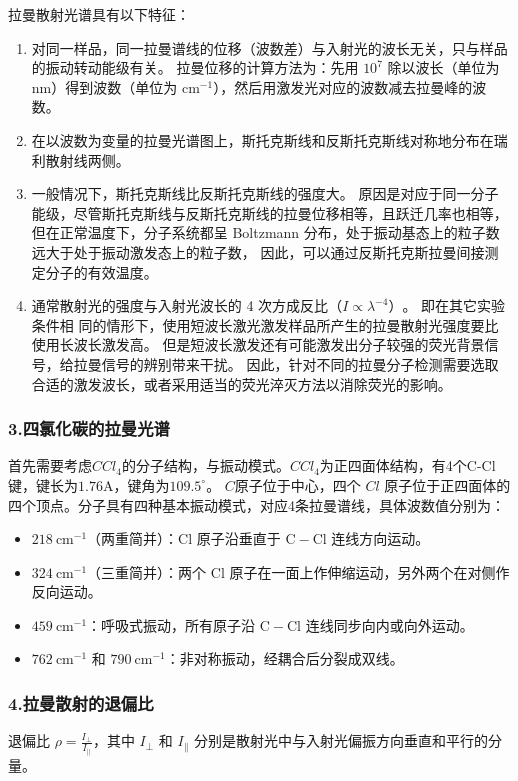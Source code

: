 \documentclass[12pt,a4paper,UTF8]{ctexart}
\begin{document}
	拉曼散射光谱具有以下特征：\cite{wiki_raman}
	\begin{enumerate}
		\item 对同一样品，同一拉曼谱线的位移（波数差）与入射光的波长无关，只与样品的振动转动能级有关。
		拉曼位移的计算方法为：先用 $10^7$ 除以波长（单位为 $\mathrm{nm}$）得到波数（单位为 $\mathrm{cm}^{-1}$），然后用激发光对应的波数减去拉曼峰的波数。
		\item 在以波数为变量的拉曼光谱图上，斯托克斯线和反斯托克斯线对称地分布在瑞利散射线两侧。
		\item 一般情况下，斯托克斯线比反斯托克斯线的强度大。
		原因是对应于同一分子能级，尽管斯托克斯线与反斯托克斯线的拉曼位移相等，且跃迁几率也相等，
		但在正常温度下，分子系统都呈 Boltzmann 分布，处于振动基态上的粒子数远大于处于振动激发态上的粒子数，
		因此，可以通过反斯托克斯拉曼间接测定分子的有效温度。
		\item 通常散射光的强度与入射光波长的 4 次方成反比$（I \propto \lambda^{-4}）$。 即在其它实验条件相
		同的情形下，使用短波长激光激发样品所产生的拉曼散射光强度要比使用长波长激发高。
		但是短波长激发还有可能激发出分子较强的荧光背景信号，给拉曼信号的辨别带来干扰。
		因此，针对不同的拉曼分子检测需要选取合适的激发波长，或者采用适当的荧光淬灭方法以消除荧光的影响。

	\end{enumerate}

\subsubsection*{3.四氯化碳的拉曼光谱}
	首先需要考虑$CCl_{4}$的分子结构，与振动模式。$CCl_{4}$为正四面体结构，有4个C-Cl键，键长为$1.76 \mathrm{A}$，键角为$109.5^{\circ}$。
	$ C $原子位于中心，四个 $ Cl $ 原子位于正四面体的四个顶点。分子具有四种基本振动模式，对应4条拉曼谱线，具体波数值分别为：
	\begin{itemize}
		\item $218 \mathrm{~cm}^{-1}$（两重简并）：$\mathrm{Cl}$ 原子沿垂直于 $\mathrm{C-Cl}$ 连线方向运动。
		\item $324 \mathrm{~cm}^{-1}$（三重简并）：两个 $\mathrm{Cl}$ 原子在一面上作伸缩运动，另外两个在对侧作反向运动。
		\item $459 \mathrm{~cm}^{-1}$：呼吸式振动，所有原子沿 $\mathrm{C-Cl}$ 连线同步向内或向外运动。
		\item $762 \mathrm{~cm}^{-1}$ 和 $790 \mathrm{~cm}^{-1}$：非对称振动，经耦合后分裂成双线。
	\end{itemize}

\subsubsection*{4.拉曼散射的退偏比}
	退偏比 $\rho = \frac{I_{\perp}}{I_{\parallel}}$，其中 $I_{\perp}$ 和 $I_{\parallel}$ 分别是散射光中与入射光偏振方向垂直和平行的分量。
	
\end{document}
